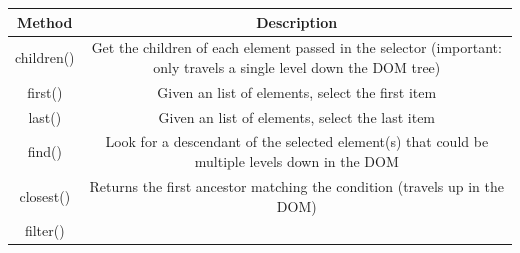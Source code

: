\documentclass[]{book}
\begin{document}
\begin{longtable}[]{@{}cc@{}}
\toprule
\begin{minipage}[b]{0.42\columnwidth}\centering
Method\strut
\end{minipage} & \begin{minipage}[b]{0.52\columnwidth}\centering
Description\strut
\end{minipage}\tabularnewline
\midrule
\endhead
\begin{minipage}[t]{0.42\columnwidth}\centering
children()\strut
\end{minipage} & \begin{minipage}[t]{0.52\columnwidth}\centering
Get the children of each element passed in the selector (important: only travels a single level down the DOM tree)\strut
\end{minipage}\tabularnewline
\begin{minipage}[t]{0.42\columnwidth}\centering
first()\strut
\end{minipage} & \begin{minipage}[t]{0.52\columnwidth}\centering
Given an list of elements, select the first item\strut
\end{minipage}\tabularnewline
\begin{minipage}[t]{0.42\columnwidth}\centering
last()\strut
\end{minipage} & \begin{minipage}[t]{0.52\columnwidth}\centering
Given an list of elements, select the last item\strut
\end{minipage}\tabularnewline
\begin{minipage}[t]{0.42\columnwidth}\centering
find()\strut
\end{minipage} & \begin{minipage}[t]{0.52\columnwidth}\centering
Look for a descendant of the selected element(s) that could be multiple levels down in the DOM\strut
\end{minipage}\tabularnewline
\begin{minipage}[t]{0.42\columnwidth}\centering
closest()\strut
\end{minipage} & \begin{minipage}[t]{0.52\columnwidth}\centering
Returns the first ancestor matching the condition (travels up in the DOM)\strut
\end{minipage}\tabularnewline
\begin{minipage}[t]{0.42\columnwidth}\centering
filter()\strut
\end{minipage} & \begin{minipage}[t]{0.52\columnwidth}\centering

\end{minipage}
\end{longtable}
\end{document}
